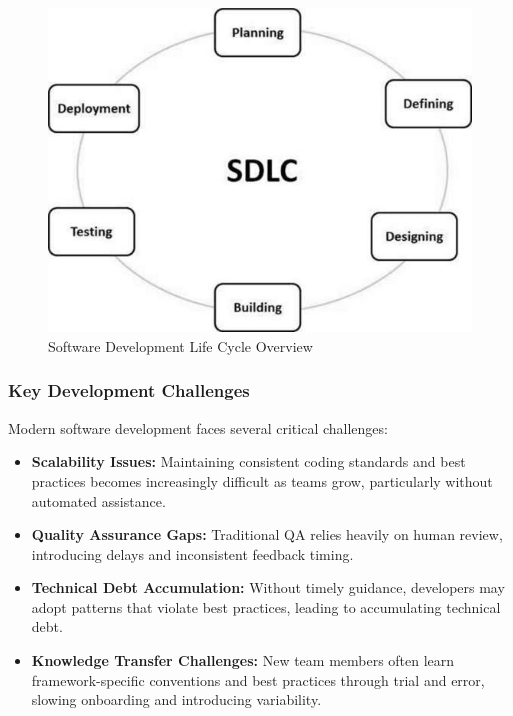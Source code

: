 \begin{spacing}{1.2}
\begin{figure}[H]
    \centering
    \includegraphics[scale=0.65]{Images/sdlc_stages.jpg}
    \caption{Software Development Life Cycle Overview}
    \label{fig:sdlc_cycle}
\end{figure}

\subsubsection*{Key Development Challenges}
Modern software development faces several critical challenges:

\begin{itemize}
    \item \textbf{Scalability Issues:} Maintaining consistent coding standards and best practices becomes increasingly difficult as teams grow, particularly without automated assistance.
    
    \item \textbf{Quality Assurance Gaps:} Traditional QA relies heavily on human review, introducing delays and inconsistent feedback timing.
    
    \item \textbf{Technical Debt Accumulation:} Without timely guidance, developers may adopt patterns that violate best practices, leading to accumulating technical debt.
    
    \item \textbf{Knowledge Transfer Challenges:} New team members often learn framework-specific conventions and best practices through trial and error, slowing onboarding and introducing variability.
\end{itemize}


\end{spacing}
